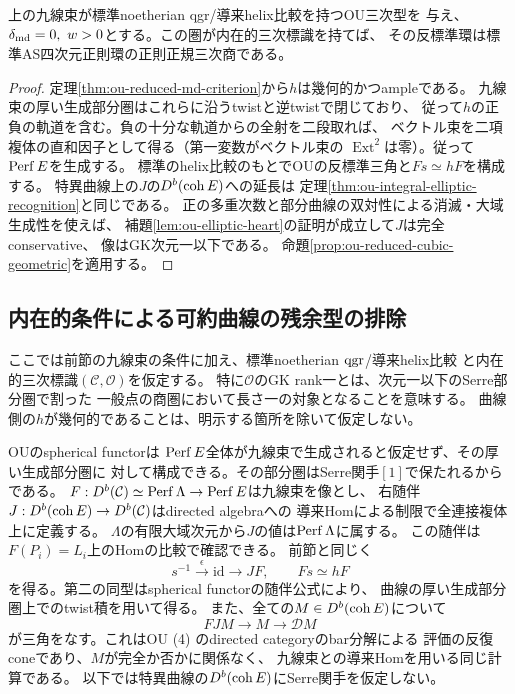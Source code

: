 \begin{corollary}[可約被約曲線型の標識付き認識の範囲]
\label{cor:ou-reduced-md-recognition}
上の九線束が標準noetherian qgr/導来helix比較を持つOU三次型を
与え、$\delta_{\rm md}=0,\ w>0$とする。この圏が内在的三次標識を持てば、
その反標準環は標準AS四次元正則環の正則正規三次商である。
\end{corollary}
\begin{proof}
定理\ref{thm:ou-reduced-md-criterion}から$h$は幾何的かつampleである。
九線束の厚い生成部分圏はこれらに沿うtwistと逆twistで閉じており、
従って$h$の正負の軌道を含む。負の十分な軌道からの全射を二段取れば、
ベクトル束を二項複体の直和因子として得る（第一変数がベクトル束の
$\operatorname{Ext}^2$は零）。従って$\operatorname{Perf} E$を生成する。
標準のhelix比較のもとでOUの反標準三角と$Fs\simeq hF$を構成する。
特異曲線上の$J$の$D^b(\operatorname{coh} E)$への延長は
定理\ref{thm:ou-integral-elliptic-recognition}と同じである。
正の多重次数と部分曲線の双対性による消滅・大域生成性を使えば、
補題\ref{lem:ou-elliptic-heart}の証明が成立して$J$は完全conservative、
像はGK次元一以下である。
命題\ref{prop:ou-reduced-cubic-geometric}を適用する。
\end{proof}

\subsection{内在的条件による可約曲線の残余型の排除}
\label{subsec:ou-reducible-intrinsic-obstructions}

ここでは前節の九線束の条件に加え、標準noetherian $\operatorname{qgr}$/導来helix比較
と内在的三次標識$(\mathcal C,\mathcal O)$を仮定する。
特に$\mathcal O$のGK rank一とは、次元一以下のSerre部分圏で割った
一般点の商圏において長さ一の対象となることを意味する。
曲線側の$h$が幾何的であることは、明示する箇所を除いて仮定しない。

OU\cite[pp.~1--2, (3)--(5)]{OUSpherical2020}のspherical functorは
$\operatorname{Perf} E$全体が九線束で生成されると仮定せず、その厚い生成部分圏に
対して構成できる。その部分圏はSerre関手$[1]$で保たれるからである。
$F:D^b(\mathcal C)\simeq\operatorname{Perf}\Lambda\to\operatorname{Perf} E$は九線束を像とし、
右随伴$J:D^b(\operatorname{coh} E)\to D^b(\mathcal C)$はdirected algebraへの
導来Homによる制限で全連接複体上に定義する。
$\Lambda$の有限大域次元から$J$の値は$\operatorname{Perf}\Lambda$に属する。
この随伴は$F(P_i)=L_i$上のHomの比較で確認できる。
前節と同じく
\[
 s^{-1}\xrightarrow{\epsilon}\mathrm{id}\longrightarrow JF,
 \qquad Fs\simeq hF
\]
を得る。第二の同型はspherical functorの随伴公式により、
曲線の厚い生成部分圏上でのtwist積を用いて得る。
また、全ての$M\in D^b(\operatorname{coh} E)$について
\begin{equation}\label{eq:ou-residual-FJ}
 FJM\longrightarrow M\longrightarrow\mathcal D M
\end{equation}
が三角をなす。これはOU (4) のdirected categoryのbar分解による
評価の反復coneであり、$M$が完全か否かに関係なく、
九線束との導来Homを用いる同じ計算である。
以下では特異曲線の$D^b(\operatorname{coh} E)$にSerre関手を仮定しない。


